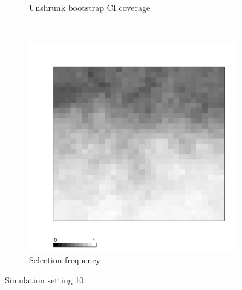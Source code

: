 \documentclass[authoryear, review, 11pt]{elsarticle}
\begin{document}
\begin{figure}
\begin{subfigure}[b]{0.45\textwidth}
		\caption{Unshrunk bootstrap CI coverage}
	\end{subfigure}%
	~ %
	\begin{subfigure}[b]{0.45\textwidth}
	\centering
		\includegraphics[width=\textwidth]{../../figures/simulation/X1.15.10.selection.pdf}
		\caption{Selection frequency}
	\end{subfigure}
	\caption{Simulation setting 10}
\end{figure}
	
	\clearpage
\end{document}
